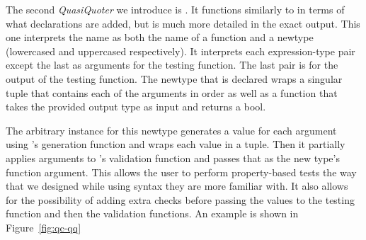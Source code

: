 \par The second \textit{QuasiQuoter} we introduce is .
    It functions similarly to  in terms of what declarations are added, but is much more detailed in the exact output.
    This one interprets the name as both the name of a function and a newtype (lowercased and uppercased respectively). It interprets
    each expression-type pair except the last as arguments for the testing function. The last pair is for the output of the testing function.
    The newtype that is declared wraps a singular tuple that contains each of the arguments in order as well as a function that takes the
    provided output type as input and returns a bool.
\par The arbitrary instance for this newtype generates a value for each argument using \ourDSL's generation function and wraps each value in a tuple.
    Then it partially applies arguments to \ourDSL's validation function and passes that as the new type's function argument. This allows
    the user to perform property-based tests the way that we designed while using syntax they are more familiar with. It also allows for the
    possibility of adding extra checks before passing the values to the testing function and then the validation functions.
    An example is shown in Figure~\ref{fig:qc-qq}
